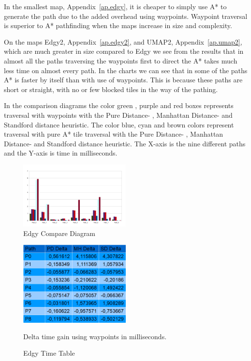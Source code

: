 \documentclass[a4paper]{article}
\begin{document}
In the smallest map, Appendix~\ref{ap.edgy}, it is cheaper to simply use A* to generate the path due to the added overhead using waypoints. Waypoint traversal is superior to A* pathfinding when the maps increase in size and complexity.
	
On the maps Edgy2, Appendix~\ref{ap.edgy2}, and UMAP2, Appendix~\ref{ap.umap2}, which are much greater in size compared to Edgy we see from the results that in almost all the paths traversing the waypoints first to direct the A* takes much less time on almost every path. In the charts we can see that in some of the paths
A* is faster by itself than with use of waypoints. This is because these paths are short or straight, with no or few blocked tiles in the way of the pathing.
		
In the comparison diagrams the color green , purple and red boxes represents traversal with waypoints with the Pure Distance- , Manhattan Distance- and Standford distance heuristic.
The color blue, cyan and brown colors represent traversal with pure A* tile traversal with the Pure Distance- , Manhattan Distance- and Standford distance heuristic.
The  X-axis is the nine different paths and the Y-axis is time in milliseconds.

\begin{figure}[h!]
\centering
\includegraphics[width=0.5\textwidth,height=\textheight,keepaspectratio]{ChartsAndFigures/Edgy_d2.png}
\caption{Edgy Compare Diagram}
\label{fig:Edgy_d2}
\end{figure}
\begin{figure}[h!]
\centering
\includegraphics[width=0.5\textwidth,height=\textheight,keepaspectratio]{ChartsAndFigures/Edgy_timeTable.png}
\caption{Edgy Time Table}
Delta time gain using waypoints in milliseconds.
\label{fig:Edgy_cd}
\end{figure}
\end{document}
